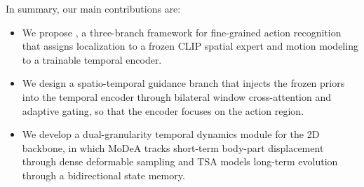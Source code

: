 In summary, our main contributions are:
\begin{itemize}
  \item We propose \dgtdm, a three-branch framework for fine-grained action
  recognition that assigns localization to a frozen CLIP spatial expert and
  motion modeling to a trainable temporal encoder.
  \item We design a spatio-temporal guidance branch that injects the frozen
  priors into the temporal encoder through bilateral window cross-attention
  and adaptive gating, so that the encoder focuses on the action region.
  \item We develop a dual-granularity temporal dynamics module for the 2D
  backbone, in which MoDeA tracks short-term body-part displacement through
  dense deformable sampling and TSA models long-term evolution through a
  bidirectional state memory.
\end{itemize}
